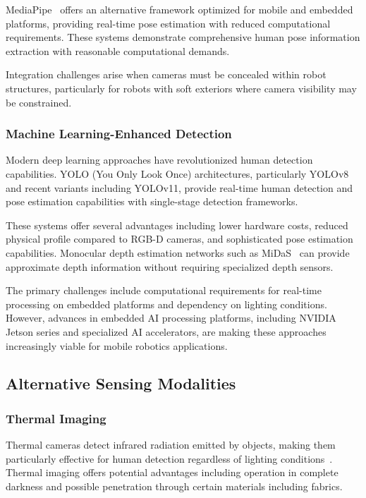 MediaPipe~\cite{lugaresi2019mediapipe} offers an alternative framework optimized for mobile and embedded platforms, providing real-time pose estimation with reduced computational requirements. These systems demonstrate comprehensive human pose information extraction with reasonable computational demands.

Integration challenges arise when cameras must be concealed within robot structures, particularly for robots with soft exteriors where camera visibility may be constrained.

\subsubsection{Machine Learning-Enhanced Detection}
Modern deep learning approaches have revolutionized human detection capabilities. YOLO (You Only Look Once) architectures, particularly YOLOv8~\cite{redmon2016you} and recent variants including YOLOv11, provide real-time human detection and pose estimation capabilities with single-stage detection frameworks.

These systems offer several advantages including lower hardware costs, reduced physical profile compared to RGB-D cameras, and sophisticated pose estimation capabilities. Monocular depth estimation networks such as MiDaS~\cite{ranftl2020towards} can provide approximate depth information without requiring specialized depth sensors.

The primary challenges include computational requirements for real-time processing on embedded platforms and dependency on lighting conditions. However, advances in embedded AI processing platforms, including NVIDIA Jetson series and specialized AI accelerators, are making these approaches increasingly viable for mobile robotics applications.

\subsection{Alternative Sensing Modalities}
\subsubsection{Thermal Imaging}
Thermal cameras detect infrared radiation emitted by objects, making them particularly effective for human detection regardless of lighting conditions~\cite{thermal2019detection}. Thermal imaging offers potential advantages including operation in complete darkness and possible penetration through certain materials including fabrics.

